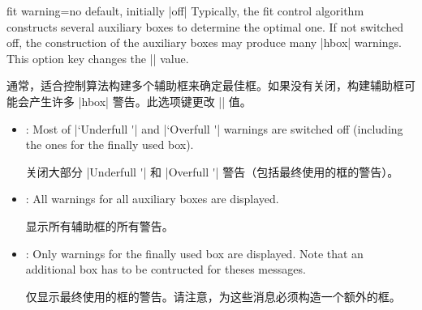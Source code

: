 \begin{docTcbKey}{fit warning}{=}{no default, initially |off|}
Typically, the fit control algorithm constructs several auxiliary boxes
to determine the optimal one. If not switched off, the construction of
the auxiliary boxes may produce many |hbox| warnings. This option key
changes the |\hbadness| value.

通常，适合控制算法构建多个辅助框来确定最佳框。如果没有关闭，构建辅助框可能会产生许多 |hbox| 警告。此选项键更改 |\hbadness| 值。
  \begin{itemize}
  \item{}: Most of |`Underfull \hbox'| and |`Overfull \hbox'| warnings are
    switched off (including the ones for the finally used box).

    关闭大部分 |Underfull \hbox'| 和 |Overfull \hbox'| 警告（包括最终使用的框的警告）。
  \item{}: All warnings for all auxiliary boxes are displayed.

  显示所有辅助框的所有警告。
  \item{}: Only warnings for the finally used box are displayed.
    Note that an additional box has to be contructed for theses messages.

    仅显示最终使用的框的警告。请注意，为这些消息必须构造一个额外的框。
  \end{itemize}
\end{docTcbKey}

